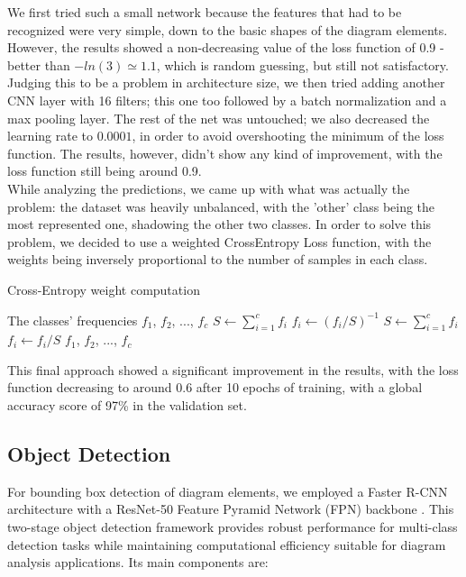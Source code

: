 \documentclass[conference]{IEEEtran}
\begin{document}
We first tried such a small network because the features that had to be recognized were very simple, down to the basic shapes of the diagram elements.
However, the results showed a non-decreasing value of the loss function of 0.9 - better than $-ln(3) \simeq 1.1$, which is random guessing, but still not satisfactory.
\\

Judging this to be a problem in architecture size, we then tried adding another CNN layer with 16 filters; this one too followed by a batch normalization and a max pooling layer.
The rest of the net was untouched; we also decreased the learning rate to $0.0001$, in order to avoid overshooting the minimum of the loss function.
The results, however, didn't show any kind of improvement, with the loss function still being around 0.9.
\\

While analyzing the predictions, we came up with what was actually the problem: the dataset was heavily unbalanced, with the 'other' class being the most represented one, shadowing the other two classes.
In order to solve this problem, we decided to use a weighted CrossEntropy Loss function, with the weights being inversely proportional to the number of samples in each class.

\begin{algorithm}
	\caption{Cross-Entropy weight computation}
	\begin{algorithmic}[1]
		\REQUIRE The classes' frequencies $f_1$, $f_2$, ..., $f_c$
		\STATE $S \gets \sum_{i = 1}^c f_i$
		\STATE $f_i \gets (f_i / S)^{-1}$
		\STATE $S \gets \sum_{i = 1}^c f_i$
		\STATE $f_i \gets f_i / S$
		\RETURN $f_1$, $f_2$, ..., $f_c$
	\end{algorithmic}
\end{algorithm}

This final approach showed a significant improvement in the results, with the loss function decreasing to around 0.6 after 10 epochs of training, with a global accuracy score of 97\% in the validation set.

\subsection{Object Detection}
\label{sec:obj_det}

For bounding box detection of diagram elements, we employed a Faster R-CNN architecture \cite{rcnn} with a ResNet-50 Feature Pyramid Network (FPN) backbone \cite{lin2017feature}. This two-stage object detection framework provides robust performance for multi-class detection tasks while maintaining computational efficiency suitable for diagram analysis applications.
Its main components are:
\end{document}
